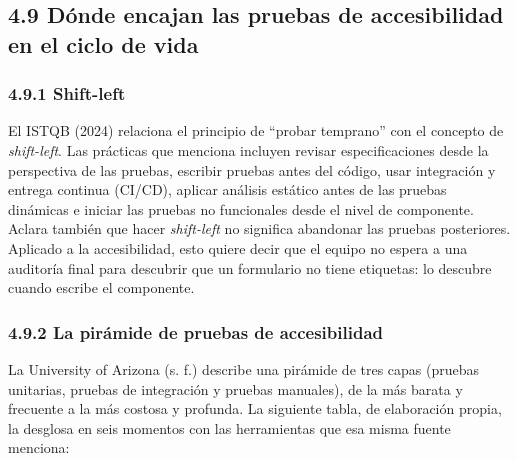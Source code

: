 \documentclass[10pt,letterpaper,onecolumn]{IEEEtran}
\begin{document}
\subsection{4.9 Dónde encajan las pruebas de accesibilidad en el ciclo de vida}\label{duxf3nde-encajan-las-pruebas-de-accesibilidad-en-el-ciclo-de-vida}

\subsubsection{4.9.1 Shift-left}\label{shift-left}

El ISTQB (2024) relaciona el principio de ``probar temprano'' con el concepto de \emph{shift-left}. Las prácticas que menciona incluyen revisar especificaciones desde la perspectiva de las pruebas, escribir pruebas antes del código, usar integración y entrega continua (CI/CD), aplicar análisis estático antes de las pruebas dinámicas e iniciar las pruebas no funcionales desde el nivel de componente. Aclara también que hacer \emph{shift-left} no significa abandonar las pruebas posteriores. Aplicado a la accesibilidad, esto quiere decir que el equipo no espera a una auditoría final para descubrir que un formulario no tiene etiquetas: lo descubre cuando escribe el componente.

\subsubsection{4.9.2 La pirámide de pruebas de accesibilidad}\label{la-piruxe1mide-de-pruebas-de-accesibilidad}

La University of Arizona (s. f.) describe una pirámide de tres capas (pruebas unitarias, pruebas de integración y pruebas manuales), de la más barata y frecuente a la más costosa y profunda. La siguiente tabla, de elaboración propia, la desglosa en seis momentos con las herramientas que esa misma fuente menciona:
\end{document}
